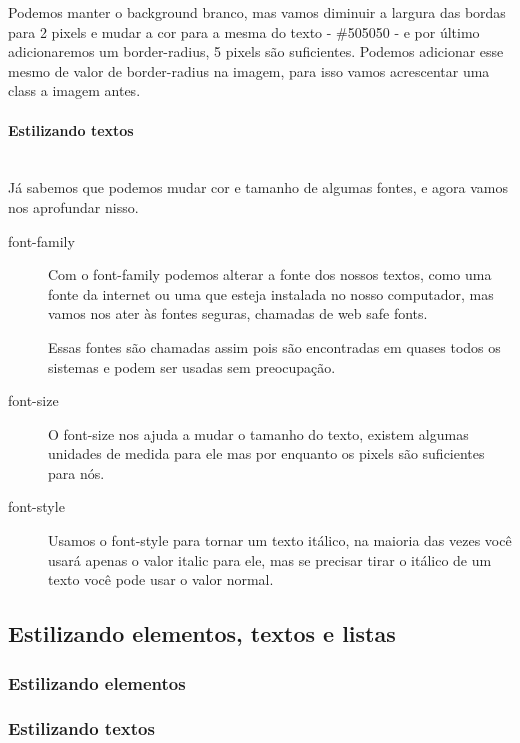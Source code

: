 \documentclass[12pt,a4paper]{article}
\begin{document}
	Podemos manter o background branco, mas vamos diminuir a largura das bordas para 2 pixels e mudar a cor para a mesma do texto - \#505050 - e por último adicionaremos um border-radius, 5 pixels são suficientes. Podemos adicionar esse mesmo de valor de border-radius na imagem, para isso vamos acrescentar uma class a imagem antes.
	
	
	
	\paragraph{Estilizando textos} \mbox{} \\
	
	Já sabemos que podemos mudar cor e tamanho de algumas fontes, e agora vamos nos aprofundar nisso.
	
	
	\begin{description}
		\item[font-family] Com o font-family podemos alterar a fonte dos nossos textos, como uma fonte da internet ou uma que esteja instalada no nosso computador, mas vamos nos ater às fontes seguras, chamadas de web safe fonts.
		
		Essas fontes são chamadas assim pois são encontradas em quases todos os sistemas e podem ser usadas sem preocupação.
		
		\item[font-size] O font-size nos ajuda a mudar o tamanho do texto, existem algumas unidades de medida para ele mas por enquanto os pixels são suficientes para nós.
		
		\item[font-style] Usamos o font-style para tornar um texto itálico, na maioria das vezes você usará apenas o valor italic para ele, mas se precisar tirar o itálico de um texto você pode usar o valor normal.
	\end{description}
	
	\subsection{Estilizando elementos, textos e listas}
	\subsubsection{Estilizando elementos}
	
	\subsubsection{Estilizando textos}
	
\end{document}
